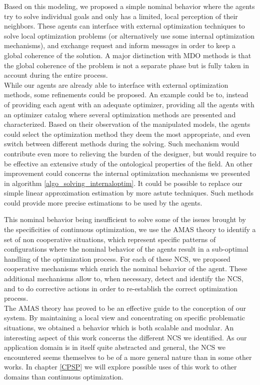 Based on this modeling, we proposed a simple nominal behavior where the agents try to solve individual goals and only has a limited, local perception of their neighbors. These agents can interface with external optimization techniques to solve local optimization problems (or alternatively use some internal optimization mechanisms), and exchange request and inform messages in order to keep a global coherence of the solution. A major distinction with MDO methods is that the global coherence of the problem is not a separate phase but is fully taken in account during the entire process.
\\
While our agents are already able to interface with external optimization methods, some refinements could be proposed. An example could be to, instead of providing each agent with an adequate optimizer, providing all the agents with an optimizer catalog where several optimization methods are presented and characterized. Based on their observation of the manipulated models, the agents could select the optimization method they deem the most appropriate, and even switch between different methods during the solving. Such mechanism would contribute even more to relieving the burden of  the designer, but would require to be effective an extensive study of the ontological properties of the field. An other improvement could concerns the internal optimization mechanisms we presented in algorithm \ref{algo_solving_internaloptim}. It could be possible to replace our simple linear approximation estimation by more astute techniques. Such methods could provide more precise estimations to be used by the agents.

This nominal behavior being insufficient to solve some of the issues brought by the specificities of continuous optimization, we use the AMAS theory to identify a set of non cooperative situations, which represent specific patterns of configurations where the nominal behavior of the agents result in a sub-optimal handling of the optimization process. For each of these NCS, we proposed cooperative mechanisms which enrich the nominal behavior of the agent. These additional mechanisms allow to, when necessary, detect and identify the NCS, and to do corrective actions in order to re-establish the correct optimization process.
\\
The AMAS theory has proved to be an effective guide to the conception of our system. By maintaining a local view and concentrating on specific problematic situations, we obtained a behavior which is both scalable and modular. An interesting aspect of this work concerns the different NCS we identified. As our application domain is in itself quite abstracted and general, the NCS we encountered seems themselves to be of a more general nature than in some other works. In chapter \ref{CPSP} we will explore possible uses of this work to other domains than continuous optimization.

